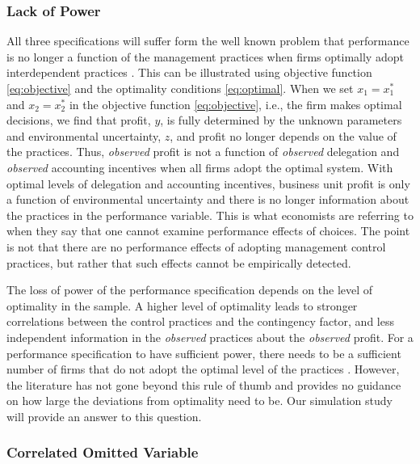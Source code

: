 \documentclass[12pt]{article}
\begin{document}
\subsubsection{Lack of Power}

All three specifications will suffer form the well known problem that performance is no longer a function of the management practices when firms optimally adopt interdependent practices \citep{grabner_management_2013}. This can be illustrated using objective function \eqref{eq:objective} and the optimality conditions \eqref{eq:optimal}. When we set $x_1 = x_1^*$ and $x_2 = x_2^*$ in the objective function  \eqref{eq:objective}, i.e., the firm makes optimal decisions, we find that profit, $y$, is fully determined by the unknown parameters and environmental uncertainty, $z$, and profit no longer depends on the value of the practices. Thus, \textit{observed} profit is not a function of \textit{observed} delegation and \textit{observed} accounting incentives when all firms adopt the optimal system. With optimal levels of delegation and accounting incentives, business unit profit is only a function of environmental uncertainty and there is no longer information about the practices in the performance variable. This is what economists are referring to when they say that one cannot examine performance effects of choices. The point is not that there are no performance effects of adopting management control practices, but rather that such effects cannot be empirically detected. 

The loss of power of the performance specification depends on the level of optimality in the sample. A higher level of optimality leads to stronger  correlations between the control practices and the contingency factor, and less independent information in the \textit{observed} practices about the \textit{observed} profit. For a performance specification to have sufficient power, there needs to be a sufficient number of firms that do not adopt the optimal level of the practices \citep{bedford_management_2016, carree_note_2011, hofmann_organizational_2017}. However, the literature has not gone beyond this rule of thumb and provides no guidance on how large the deviations from optimality need to be. Our simulation study will provide an answer to this question.

\subsubsection{Correlated Omitted Variable}
\end{document}
